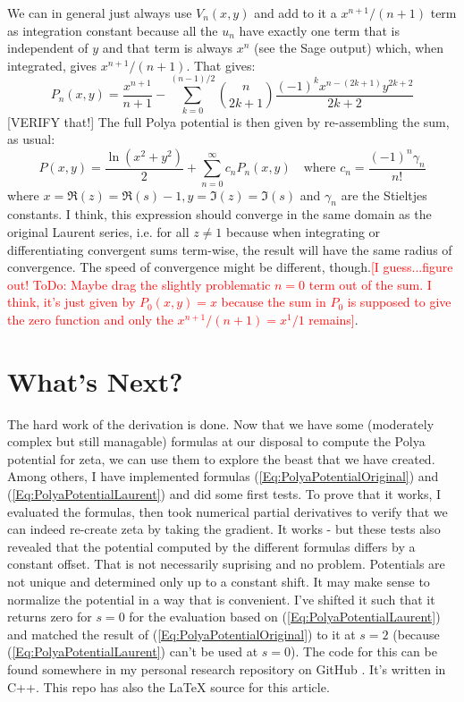 \documentclass[12pt]{article}
\begin{document}
\medskip
We can in general just always use $V_n(x,y)$ and add to it a $x^{n+1}/(n+1)$ term as integration constant because all the $u_n$ have exactly one term that is independent of $y$ and that term is always $x^n$ (see the Sage output) which, when integrated, gives $x^{n+1}/(n+1)$. That gives:
\begin{equation}
\label{Eq:PolyaPotentialLaurentTerm}	
\boxed{	
P_n(x,y) = \frac{x^{n+1}}{n+1} 
           -\sum_{k=0}^{(n-1)/2} \binom{n}{2k+1} \frac{(-1)^k x^{n-(2k+1)} y^{2k+2}}{2k+2}
}
\end{equation}
[VERIFY that!] The full Polya potential is then given by re-assembling the sum, as usual:
\begin{equation}
\label{Eq:PolyaPotentialLaurent}	
\boxed{
P(x,y) = \frac{\ln(x^2 + y^2)}{2} + \sum_{n=0}^{\infty} c_n P_n(x,y)
}
\quad \text{where } c_n = \frac{(-1)^n \gamma_n}{n!}
\end{equation}
where $x = \Re(z) = \Re(s) - 1, y = \Im(z) = \Im(s)$ and $\gamma_n$ are the Stieltjes constants. I think, this expression should converge in the same domain as the original Laurent series, i.e. for all $z \neq 1$ because when integrating or differentiating convergent sums term-wise, the result will have the same radius of convergence. The speed of convergence might be different, though.\textcolor{red}{[I guess...figure out! ToDo: Maybe drag the slightly problematic $n=0$ term out of the sum. I think, it's just given by $P_0(x,y) = x$ because the sum in $P_0$ is supposed to give the zero function and only the $x^{n+1}/(n+1) = x^1/1$ remains]}.

\section{What's Next?}
The hard work of the derivation is done. Now that we have some (moderately complex but still managable) formulas at our disposal to compute the Polya potential for zeta, we can use them to explore the beast that we have created. Among others, I have implemented formulas (\ref{Eq:PolyaPotentialOriginal}) and (\ref{Eq:PolyaPotentialLaurent}) and did some first tests. To prove that it works, I evaluated the formulas, then took numerical partial derivatives to verify that we can indeed re-create zeta by taking the gradient. It works - but these tests also revealed that the potential computed by the different formulas differs by a constant offset. That is not necessarily suprising and no problem. Potentials are not unique and determined only up to a constant shift. It may make sense to normalize the potential in a way that is convenient. I've shifted it such that it returns zero for $s=0$ for the evaluation based on (\ref{Eq:PolyaPotentialLaurent}) and matched the result of (\ref{Eq:PolyaPotentialOriginal}) to it at $s=2$ (because (\ref{Eq:PolyaPotentialLaurent}) can't be used at $s=0$). The code for this can be found somewhere in my personal research repository on GitHub \cite{GitHub}. It's written in C++. This repo has also the LaTeX source for this article.
\end{document}
